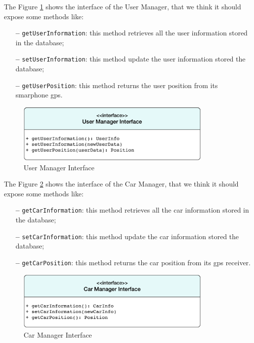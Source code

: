\newline
The Figure \ref{fig:user} shows the interface of the User Manager, that we think it should expose some methods like:

\begin{itemize}
\item[\textbf{--}] \texttt{getUserInformation}: this method retrieves all the user information stored in the database;
\item[\textbf{--}] \texttt{setUserInformation}: this method update the user  information stored the database;
\item[\textbf{--}] \texttt{getUserPosition}: this method returns the user position from its smarphone \acs{gps}.
\end{itemize}

\begin{figure}[htbp]
\centering
\vspace{72pt}
\includegraphics[width=0.85\textwidth]{Images/UserManager.pdf}
\vspace{10pt}
\caption{User Manager Interface}
\label{fig:user}
\end{figure}
\clearpage

\newline
The Figure \ref{fig:car} shows the interface of the Car Manager, that we think it should expose some methods like:

\begin{itemize}
\item[\textbf{--}] \texttt{getCarInformation}: this method retrieves all the car information stored in the database;
\item[\textbf{--}] \texttt{setCarInformation}: this method update the car information stored the database;
\item[\textbf{--}] \texttt{getCarPosition}: this method returns the car position from its \acs{gps} receiver.
\end{itemize}

\begin{figure}[htbp]
\centering
\vspace{72pt}
\includegraphics[width=0.85\textwidth]{Images/CarManager.pdf}
\vspace{10pt}
\caption{Car Manager Interface}
\label{fig:car}
\end{figure}
\clearpage

